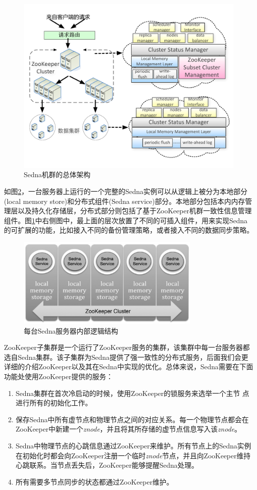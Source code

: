 \begin{figure}[h!]
\centering
\includegraphics[width=4.5in]{../figures/logic-structure2.pdf}
\caption{Sedna机群的总体架构}
\label{fig:sedna}
\end{figure}

如图\ref{fig:sedna1}，一台服务器上运行的一个完整的Sedna实例可以从逻辑上被分为本地部分(local memory store)和分布式组件(Sedna service)部分。本地部分包括本内内存管理层以及持久化存储层，分布式部分则包括了基于ZooKeeper机群一致性信息管理组件。图\ref{fig:sedna}中右侧图中，最上面的层次放置了不同的可插入组件，用来实现Sedna的可扩展的功能，比如接入不同的备份管理策略，或者接入不同的数据同步策略。

\begin{figure}[h!]
\centering
\includegraphics[width=3.5in]{../figures/SednaArc1.pdf}
\caption{每台Sedna服务器内部逻辑结构}
\label{fig:sedna1}
\end{figure}

ZooKeeper子集群是一个运行了ZooKeeper服务的集群，该集群中每一台服务器都选自Sedna集群。该子集群为Sedna提供了强一致性的分布式服务，后面我们会更详细的介绍ZooKeeper以及其在Sedna中实现的优化。总体来说，Sedna需要在下面功能处使用ZooKeeper提供的服务：
\begin{enumerate}
  \item Sedna集群在首次冷启动的时候，使用ZooKeeper的锁服务来选举一个主节
    点进行所有的初始化工作。
  \item 保存Sedna中所有虚节点和物理节点之间的对应关系。每一个物理节点都会在ZooKeeper中新建一个\textit{znode}，并且将其所存储的虚节点信息写入该\textit{znode}。
  \item Sedna中物理节点的心跳信息通过ZooKeeper来维护。所有节点上的Sedna实例在初始化时都会向ZooKeeper注册一个临时\textit{znode}节点，并且向ZooKeeper维持心跳联系。当节点丢失后，ZooKeeper能够提醒Sedna处理。
  \item 所有需要多节点同步的状态都通过ZooKeeper维护。
\end{enumerate}

